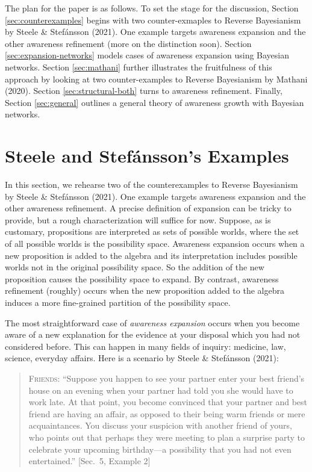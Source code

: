 \documentclass[
  11pt,
  dvipsnames,enabledeprecatedfontcommands]{scrartcl}
\begin{document}
The plan for the paper is as follows. To set the stage for the
discussion, Section \ref{sec:counterexamples} begins with two
counter-exmaples to Reverse Bayesianism by Steele \& Stefánsson (2021).
One example targets awareness expansion and the other awareness
refinement (more on the distinction soon). Section
\ref{sec:expansion-networks} models cases of awareness expansion using
Bayesian networks. Section \ref{sec:mathani} further illustrates the
fruitfulness of this approach by looking at two counter-examples to
Reverse Bayesianism by Mathani (2020). Section \ref{sec:structural-both}
turns to awareness refinement. Finally, Section \ref{sec:general}
outlines a general theory of awareness growth with Bayesian networks.

\hypertarget{steele-and-stefuxe1nssons-examples}{%
\section{Steele and Stefánsson's
Examples}\label{steele-and-stefuxe1nssons-examples}}

\label{sec:counterexamples}

In this section, we rehearse two of the counterexamples to Reverse
Bayesianism by Steele \& Stefánsson (2021). One example targets
awareness expansion and the other awareness refinement. A precise
definition of expansion can be tricky to provide, but a rough
characterization will suffice for now. Suppose, as is customary,
propositions are interpreted as sets of possible worlds, where the set
of all possible worlds is the possibility space. Awareness expansion
occurs when a new proposition is added to the algebra and its
interpretation includes possible worlds not in the original possibility
space. So the addition of the new proposition causes the possibility
space to expand. By contrast, awareness refinement (roughly) occurs when
the new proposition added to the algebra induces a more fine-grained
partition of the possibility space.

The most straightforward case of \emph{awareness expansion} occurs when
you become aware of a new explanation for the evidence at your disposal
which you had not considered before. This can happen in many fields of
inquiry: medicine, law, science, everyday affairs. Here is a scenario by
Steele \& Stefánsson (2021):

\begin{quote}
\textsc{Friends}: ``Suppose you happen to see your partner enter your
best friend's house on an evening when your partner had told you she
would have to work late. At that point, you become convinced that your
partner and best friend are having an affair, as opposed to their being
warm friends or mere acquaintances. You discuss your suspicion with
another friend of yours, who points out that perhaps they were meeting
to plan a surprise party to celebrate your upcoming birthday---a
possibility that you had not even entertained.'' {[}Sec.~5, Example 2{]}
\end{quote}
\end{document}
